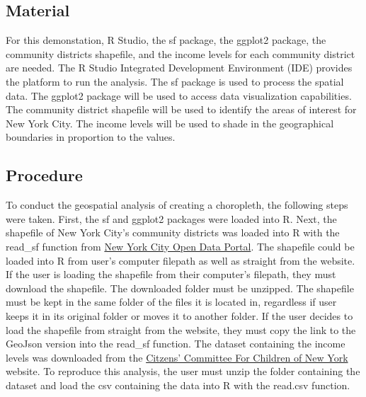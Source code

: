\documentclass[man]{apa6}
\begin{document}
\hypertarget{material}{%
\subsection{Material}\label{material}}

For this demonstation, R Studio, the sf package, the ggplot2 package, the community districts shapefile, and the income levels for each community district are needed. The R Studio Integrated Development Environment (IDE) provides the platform to run the analysis. The sf package is used to process the spatial data. The ggplot2 package will be used to access data visualization capabilities. The community district shapefile will be used to identify the areas of interest for New York City. The income levels will be used to shade in the geographical boundaries in proportion to the values.

\hypertarget{procedure}{%
\subsection{Procedure}\label{procedure}}

To conduct the geospatial analysis of creating a choropleth, the following steps were taken. First, the sf and ggplot2 packages were loaded into R. Next, the shapefile of New York City's community districts was loaded into R with the read\_sf function from \href{https://data.cityofnewyork.us/City-Government/Community-Districts/yfnk-k7r4}{New York City Open Data Portal}. The shapefile could be loaded into R from user's computer filepath as well as straight from the website. If the user is loading the shapefile from their computer's filepath, they must download the shapefile. The downloaded folder must be unzipped. The shapefile must be kept in the same folder of the files it is located in, regardless if user keeps it in its original folder or moves it to another folder. If the user decides to load the shapefile from straight from the website, they must copy the link to the GeoJson version into the read\_sf function.
The dataset containing the income levels was downloaded from the \href{https://data.cccnewyork.org/data/map/66/median-incomes\#66/49/3/107/25/a}{Citzens' Committee For Children of New York} website. To reproduce this analysis, the user must unzip the folder containing the dataset and load the csv containing the data into R with the read.csv function.
\end{document}
